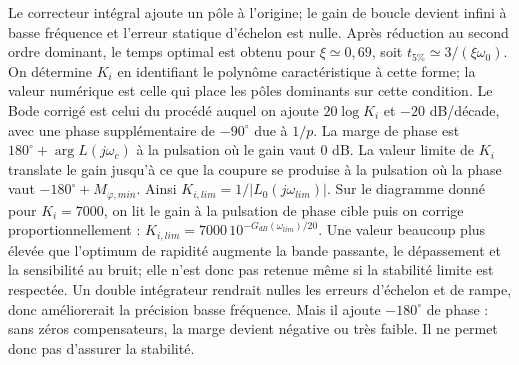 \begin{corrigebox}
Le correcteur intégral ajoute un pôle à l'origine; le gain de boucle devient
            infini à basse fréquence et l'erreur statique d'échelon est nulle.
Après réduction au second ordre dominant, le temps optimal est obtenu pour
            $\xi\simeq0,69$, soit $t_{5\%}\simeq3/(\xi\omega_0)$. On détermine $K_i$ en
            identifiant le polynôme caractéristique à cette forme; la valeur numérique est
            celle qui place les pôles dominants sur cette condition.
Le Bode corrigé est celui du procédé auquel on ajoute $20\log K_i$ et
            $-20$ dB/décade, avec une phase supplémentaire de $-90^\circ$ due à $1/p$.
La marge de phase est $180^\circ+\arg L(j\omega_c)$ à la pulsation où le
            gain vaut 0 dB.
La valeur limite de $K_i$ translate le gain jusqu'à ce que la coupure se
            produise à la pulsation où la phase vaut $-180^\circ+M_{\varphi,min}$. Ainsi
            $K_{i,lim}=1/|L_0(j\omega_{lim})|$.
Sur le diagramme donné pour $K_i=7000$, on lit le gain à la pulsation de
            phase cible puis on corrige proportionnellement :
            $K_{i,lim}=7000\,10^{-G_{dB}(\omega_{lim})/20}$.
Une valeur beaucoup plus élevée que l'optimum de rapidité augmente la
            bande passante, le dépassement et la sensibilité au bruit; elle n'est donc pas
            retenue même si la stabilité limite est respectée.
Un double intégrateur rendrait nulles les erreurs d'échelon et de rampe,
            donc améliorerait la précision basse fréquence.
Mais il ajoute $-180^\circ$ de phase : sans zéros compensateurs, la marge
            devient négative ou très faible. Il ne permet donc pas d'assurer la stabilité.
\end{corrigebox}
